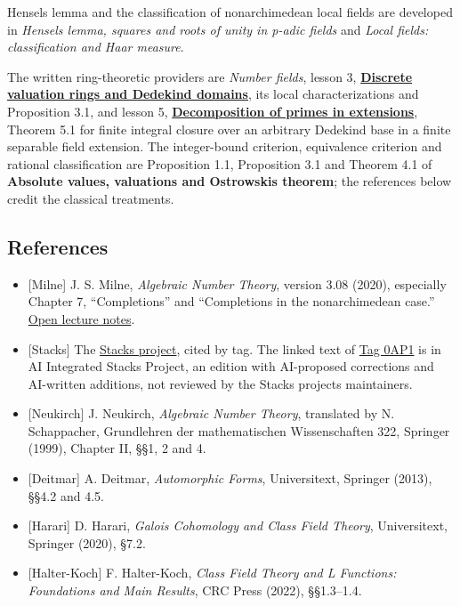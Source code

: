 \documentclass[
  english,
  11pt,
  a4paper,
]{article}
\providecommand{\tightlist}{%
  \setlength{\itemsep}{0pt}\setlength{\parskip}{0pt}}
\begin{document}
Hensel\textquotesingle s lemma and the classification of nonarchimedean
local fields are developed in \emph{Hensel\textquotesingle s lemma,
squares and roots of unity in p-adic fields} and \emph{Local fields:
classification and Haar measure}.

The written ring-theoretic providers are \emph{Number fields}, lesson 3,
\href{https://kokunoyumeto.github.io/open-mathematics-courses/courses/NT-ANT/discrete-valuation-rings-and-dedekind-domains.html}{\textbf{Discrete
valuation rings and Dedekind domains}}, its local characterizations and
Proposition 3.1, and lesson 5,
\href{https://kokunoyumeto.github.io/open-mathematics-courses/courses/NT-ANT/decomposition-of-primes-in-extensions.html}{\textbf{Decomposition
of primes in extensions}}, Theorem 5.1 for finite integral closure over
an arbitrary Dedekind base in a finite separable field extension. The
integer-bound criterion, equivalence criterion and rational
classification are Proposition 1.1, Proposition 3.1 and Theorem 4.1 of
\textbf{Absolute values, valuations and Ostrowski\textquotesingle s
theorem}; the references below credit the classical treatments.

\subsection{References}\label{NT-LOC-02--references}

\begin{itemize}
\tightlist
\item
  {[}Milne{]} J. S. Milne, \emph{Algebraic Number Theory}, version 3.08
  (2020), especially Chapter 7, ``Completions'' and ``Completions in the
  nonarchimedean case.''
  \href{https://www.jmilne.org/math/CourseNotes/ANT.pdf}{Open lecture
  notes}.
\item
  {[}Stacks{]} The \href{https://stacks.math.columbia.edu/}{Stacks
  project}, cited by tag. The linked text of
  \href{https://kokunoyumeto.github.io/stacks-zh-hans-cn/en/more-algebra.html\#more-algebra-lemma-completion-dvr}{Tag
  0AP1} is in AI Integrated Stacks Project, an edition with AI-proposed
  corrections and AI-written additions, not reviewed by the Stacks
  project\textquotesingle s maintainers.
\item
  {[}Neukirch{]} J. Neukirch, \emph{Algebraic Number Theory}, translated
  by N. Schappacher, Grundlehren der mathematischen Wissenschaften 322,
  Springer (1999), Chapter II, §§1, 2 and 4.
\item
  {[}Deitmar{]} A. Deitmar, \emph{Automorphic Forms}, Universitext,
  Springer (2013), §§4.2 and 4.5.
\item
  {[}Harari{]} D. Harari, \emph{Galois Cohomology and Class Field
  Theory}, Universitext, Springer (2020), §7.2.
\item
  {[}Halter-Koch{]} F. Halter-Koch, \emph{Class Field Theory and L
  Functions: Foundations and Main Results}, CRC Press (2022),
  §§1.3--1.4.
\end{itemize}
\end{document}
